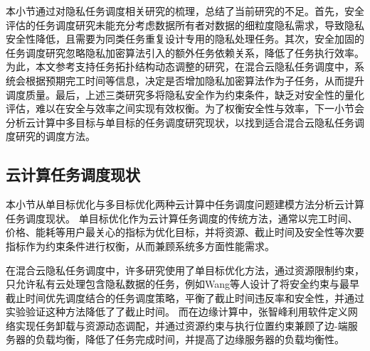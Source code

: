 
本小节通过对隐私任务调度相关研究的梳理，总结了当前研究的不足。首先，安全评估的任务调度研究\cite{sonPrivacyProtectionBased2020, zhouPrivacyRegulationAware2019}未能充分考虑数据所有者对数据的细粒度隐私需求，导致隐私安全性降低，且需要为同类任务重复设计专用的隐私处理任务。其次，安全加固的任务调度研究\cite{caiFailureresilientDAGTask2021}忽略隐私加密算法引入的额外任务依赖关系，降低了任务执行效率。为此，本文参考支持任务拓扑结构动态调整的研究\cite{stavrinidesSchedulingLinearWorkflows2023}，在混合云隐私任务调度中，系统会根据预期完工时间等信息，决定是否增加隐私加密算法作为子任务，从而提升调度质量。最后，上述三类研究多将隐私安全作为约束条件，缺乏对安全性的量化评估，难以在安全与效率之间实现有效权衡\cite{leiPrivacySecurityawareWorkflow2022, shishidoOptimizingSecurityCost2021, wangSecurityawareTaskScheduling2021}。为了权衡安全性与效率，下一小节会分析云计算中多目标与单目标的任务调度研究现状，以找到适合混合云隐私任务调度研究的调度方法。

\subsection{云计算任务调度现状}

本小节从单目标优化与多目标优化两种云计算中任务调度问题建模方法分析云计算任务调度现状。
单目标优化作为云计算任务调度的传统方法，通常以完工时间、价格、能耗等用户最关心的指标为优化目标，并将资源、截止时间及安全性等次要指标作为约束条件进行权衡，从而兼顾系统多方面性能需求\cite{abrahamMultiObjectiveOptimizationTechniques2025}。

在混合云隐私任务调度中，许多研究使用了单目标优化方法，通过资源限制约束，只允许私有云处理包含隐私数据的任务，例如Wang等人\cite{wangSecurityawareTaskScheduling2021}设计了将安全约束与最早截止时间优先调度结合的任务调度策略，平衡了截止时间违反率和安全性，并通过实验验证这种方法降低了了截止时间。
而在边缘计算中，张智峰\cite{ZhangZhiFengBianyuanbianyuanxiezuohuanjingxiarenwutiaodufangfayanjiu2023}利用软件定义网络实现任务卸载与资源动态调配，并通过资源约束与执行位置约束兼顾了边-端服务器的负载均衡，降低了任务完成时间，并提高了边缘服务器的负载均衡性。

